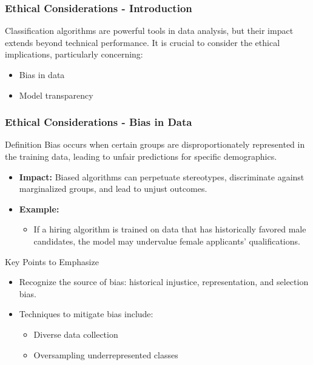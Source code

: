 \documentclass{beamer}
\begin{document}
\begin{frame}[fragile]
    \frametitle{Ethical Considerations - Introduction}
    Classification algorithms are powerful tools in data analysis, but their impact extends beyond technical performance. 
    It is crucial to consider the ethical implications, particularly concerning:
    \begin{itemize}
        \item Bias in data
        \item Model transparency
    \end{itemize}
\end{frame}

\begin{frame}[fragile]
    \frametitle{Ethical Considerations - Bias in Data}
    \begin{block}{Definition}
        Bias occurs when certain groups are disproportionately represented in the training data, leading to unfair predictions for specific demographics.
    \end{block}
    
    \begin{itemize}
        \item \textbf{Impact:} Biased algorithms can perpetuate stereotypes, discriminate against marginalized groups, and lead to unjust outcomes.
        \item \textbf{Example:} 
        \begin{itemize}
            \item If a hiring algorithm is trained on data that has historically favored male candidates, the model may undervalue female applicants' qualifications.
        \end{itemize}
    \end{itemize}

    \begin{block}{Key Points to Emphasize}
        \begin{itemize}
            \item Recognize the source of bias: historical injustice, representation, and selection bias.
            \item Techniques to mitigate bias include:
            \begin{itemize}
                \item Diverse data collection
                \item Oversampling underrepresented classes
            \end{itemize}
        \end{itemize}
    \end{block}
\end{frame}
\end{document}
